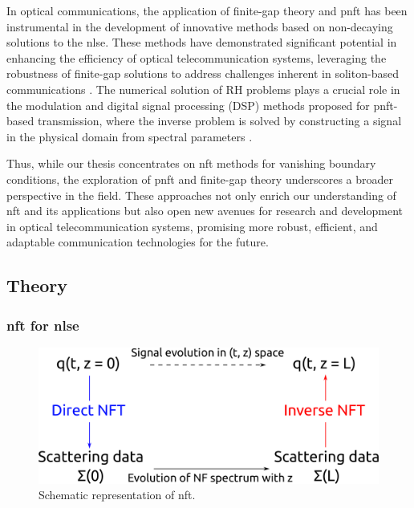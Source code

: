 In optical communications, the application of finite-gap theory and \acrshort{pnft} has been instrumental in the development of innovative methods based on non-decaying solutions to the \acrshort{nlse}. These methods have demonstrated significant potential in enhancing the efficiency of optical telecommunication systems, leveraging the robustness of finite-gap solutions to address challenges inherent in soliton-based communications \cite{goossens2020data,kamalian2016periodic,kamalian2018signal,kamalian2020full,bogdanov2023phase}. The numerical solution of RH problems plays a crucial role in the modulation and digital signal processing (DSP) methods proposed for \acrshort{pnft}-based transmission, where the inverse problem is solved by constructing a signal in the physical domain from spectral parameters \cite{kamalian2018signal, kamalian2020full}.

Thus, while our thesis concentrates on \acrshort{nft} methods for vanishing boundary conditions, the exploration of \acrshort{pnft} and finite-gap theory underscores a broader perspective in the field. These approaches not only enrich our understanding of \acrshort{nft} and its applications but also open new avenues for research and development in optical telecommunication systems, promising more robust, efficient, and adaptable communication technologies for the future.

\subsection{Theory}

\subsubsection{\acrshort{nft} for \acrlong{nlse}}

\begin{figure}[tbp]
	\centering
	\includegraphics[width=0.7\linewidth]{images/theory/nft_scheme.pdf}
	\caption{Schematic representation of \acrlong{nft}.}
	\label{fig:IST}
\end{figure}


